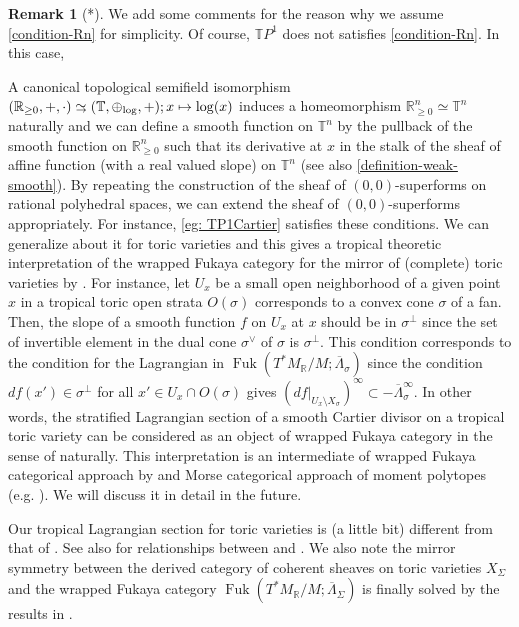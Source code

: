 \documentclass[a4paper,dvipdfmx,reqno,12pt]{amsart}
\theoremstyle{definition}
\newtheorem{remark}[theorem]{Remark}
\newcommand{\mb}[1]{\mathbb{#1}}%
\newcommand{\opn}[1]{\operatorname{#1}}
\newcommand{\simto}{ 
\mathrel{\raisebox{0.13em}{${\sim}$}}
\kern -0.75em \mathrel{\raisebox{-0.11em}{${\scriptstyle \to}$}}  
}
\numberwithin{equation}{section}
\begin{document}
\begin{remark}[*]

We add some comments for the reason 
why we assume \cref{condition-Rn} for simplicity.
Of course, $\mathbb{T}P^{1}$ does not satisfies
\cref{condition-Rn}. In this case, 

A canonical topological semifield isomorphism 
$({\mathbb{R}}_{\geq 0},+,\cdot)\simto 
(\mb{T},\oplus_{\opn{log}},+);x\mapsto \log(x)$
induces a homeomorphism ${\mathbb{R}}_{\geq 0}^{n}\simeq \mb{T}^{n}$
naturally and we can define a smooth function on 
$\mb{T}^{n}$ by the pullback of the smooth function on 
${\mathbb{R}}_{\geq 0}^{n}$ such that its derivative at $x$ in
the stalk of the sheaf of affine function
(with a real valued slope) on $\mb{T}^{n}$
(see also \cref{definition-weak-smooth}).
 By repeating
the construction of the sheaf of $(0,0)$-superforms on 
rational polyhedral spaces, we can extend the sheaf of
$(0,0)$-superforms appropriately.
For instance, \cref{eg: TP1Cartier} satisfies 
these conditions. We can generalize about it for toric
varieties and this gives a tropical theoretic interpretation 
of the wrapped Fukaya category for the mirror of
(complete) toric varieties by \cite{MR2871160}.
For instance, let $U_{x}$ be a small open neighborhood of 
a given point $x$ in a tropical toric open strata $O(\sigma)$
 corresponds to a convex cone $\sigma$ of a fan.
Then, the slope of a smooth function $f$ on $U_{x}$ at $x$
should be in $\sigma^{\bot}$ since the set of 
invertible element
in the dual cone $\sigma^{\vee}$ of $\sigma$ is $\sigma^{\bot}$.
This condition corresponds to the condition for the Lagrangian
in $\opn{Fuk}(T^{*}M_{{\mathbb{R}}}/M;\overline{\Lambda}_{\sigma})$ 
\cite[3.1]{MR2871160} since
the condition $df(x')\in\sigma^{\bot}$ for all 
$x'\in U_x\cap O(\sigma)$ gives 
$(df|_{U_{x}\setminus X_{\sigma}})^{\infty}\subset 
-\overline{\Lambda}_{\sigma}^{\infty}$.
In other words, the stratified Lagrangian section 
of a smooth Cartier divisor on a tropical toric variety
can be considered as 
an object of wrapped Fukaya category in the sense of
\cite{MR2871160} naturally. This interpretation is 
an intermediate of wrapped Fukaya categorical approach by
\cite{MR2871160}
and Morse categorical approach of moment polytopes
(e.g. \cite{MR4234675}).
We will discuss it in detail in the future.

Our tropical Lagrangian section for toric varieties is 
(a little bit)
different from that of \cite{MR2240909,MR2529936}.
See also \cite[Appendix C.2]{MR2871160} for relationships
between \cite{MR2871160} and \cite{MR2240909,MR2529936}.
We also note the mirror symmetry between the derived category of
coherent sheaves on toric varieties $X_{\Sigma}$ and
the wrapped Fukaya category 
$\opn{Fuk}(T^{*}M_{{\mathbb{R}}}/M;\overline{\Lambda}_{\Sigma})$
is finally solved by the results in \cite{MR4132582}.
\end{remark}
\end{document}
